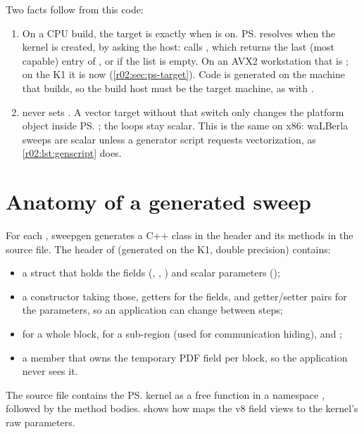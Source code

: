 Two facts follow from this code:
\begin{enumerate}
  \item On a CPU build, the target is  exactly when
         is on. \ps{} resolves
         when the kernel is created, by asking the host:
         calls , which
        returns the last (most capable) entry of , or
         if the list is empty. On an AVX2 workstation that is
        ; on the K1 it is now 
        (\cref{r02:sec:ps-target}). Code is generated on the machine that builds, so
        the build host must be the target machine, as with .
  \item {} never sets . A vector
        target without that switch only changes the platform object inside \ps{}; the
        loops stay scalar. This is the same on x86: waLBerla sweeps are scalar unless a
        generator script requests vectorization, as \cref{r02:lst:genscript} does.
\end{enumerate}

\section{Anatomy of a generated sweep}\label{r02:sec:generated-sweep}

For each , sweepgen generates a C++ class in the header and its methods in
the source file. The header of  (generated on the K1, double
precision) contains:
\begin{itemize}
  \item a  struct that holds the fields
        (, , ) and scalar parameters ();
  \item a constructor taking those, getters for the fields, and getter/setter pairs for
        the parameters, so an application can change  between steps;
  \item {} for a whole block,  for
        a sub-region (used for communication hiding), and ;
  \item a  member that owns the temporary PDF field
         per block, so the application never sees it.
\end{itemize}
The source file contains the \ps{} kernel as a free function in a namespace
, followed by the method bodies.
 shows how  maps the v8 field views to
the kernel's raw parameters.

